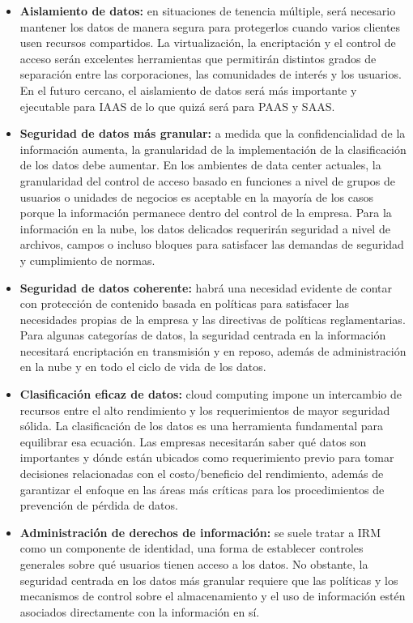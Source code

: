 \documentclass[12pt,a4paper]{article}
\begin{document}
\begin{itemize}

\item \textbf{Aislamiento de datos:} en situaciones de tenencia
múltiple, será necesario mantener los datos de manera
segura para protegerlos cuando varios clientes usen
recursos compartidos. La virtualización, la encriptación
y el control de acceso serán excelentes herramientas
que permitirán distintos grados de separación entre
las corporaciones, las comunidades de interés y los
usuarios. En el futuro cercano, el aislamiento de datos
será más importante y ejecutable para IAAS de lo que
quizá será para PAAS y SAAS.

\item \textbf{Seguridad de datos más granular:} a medida que
la confidencialidad de la información aumenta, la
granularidad de la implementación de la clasificación
de los datos debe aumentar. En los ambientes de data
center actuales, la granularidad del control de acceso
basado en funciones a nivel de grupos de usuarios o
unidades de negocios es aceptable en la mayoría de
los casos porque la información permanece dentro del
control de la empresa. Para la información en la nube,
los datos delicados requerirán seguridad a nivel de
archivos, campos o incluso bloques para satisfacer las
demandas de seguridad y cumplimiento de normas.

\item \textbf{Seguridad de datos coherente:} habrá una necesidad
evidente de contar con protección de contenido basada
en políticas para satisfacer las necesidades propias de la
empresa y las directivas de políticas reglamentarias. Para
algunas categorías de datos, la seguridad centrada en la
información necesitará encriptación en transmisión y en
reposo, además de administración en la nube y en todo
el ciclo de vida de los datos.

\item \textbf{Clasificación eficaz de datos:} cloud computing impone
un intercambio de recursos entre el alto rendimiento
y los requerimientos de mayor seguridad sólida. La
clasificación de los datos es una herramienta fundamental
para equilibrar esa ecuación. Las empresas necesitarán
saber qué datos son importantes y dónde están ubicados
como requerimiento previo para tomar decisiones
relacionadas con el costo/beneficio del rendimiento,
además de garantizar el enfoque en las áreas más
críticas para los procedimientos de prevención de
pérdida de datos.

\item \textbf{Administración de derechos de información:} se suele
tratar a IRM como un componente de identidad, una
forma de establecer controles generales sobre qué
usuarios tienen acceso a los datos. No obstante, la
seguridad centrada en los datos más granular requiere
que las políticas y los mecanismos de control sobre el
almacenamiento y el uso de información estén asociados
directamente con la información en sí.


\end{itemize}
\end{document}
